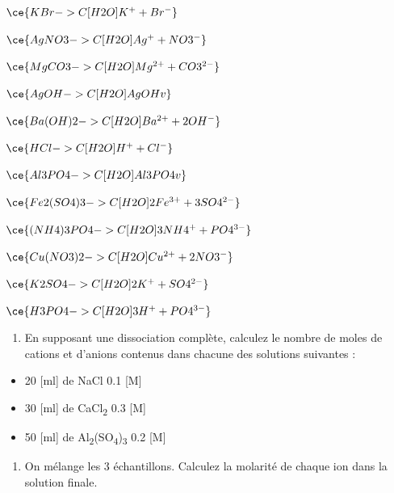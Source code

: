 \documentclass[
  11pt,
  french,
  a4paper,
  openany]{book}
\providecommand{\tightlist}{%
  \setlength{\itemsep}{0pt}\setlength{\parskip}{0pt}}
\begin{document}
\begin{Answer}

\begin{multicols}{2}
\(\ce{KBr ->C[H2O] K^{+} + Br^{-} }\)

\(\ce{AgNO3 ->C[H2O] Ag^{+} + NO3^{-} }\)

\(\ce{MgCO3 ->C[H2O] Mg^{2+} + CO3^{2-} }\)

\(\ce{AgOH ->C[H2O] AgOH v }\)

\(\ce{Ba(OH)2 ->C[H2O] Ba^{2+} + 2OH^{-} }\)

\(\ce{HCl ->C[H2O] H^{+} + Cl^{-}}\)

\(\ce{Al3PO4 ->C[H2O] Al3PO4 v }\)

\(\ce{Fe2(SO4)3 ->C[H2O] 2Fe^{3+} + 3SO4^{2-} }\)

\(\ce{(NH4)3PO4 ->C[H2O] 3NH4^{+} + PO4^{3-} }\)

\(\ce{Cu(NO3)2 ->C[H2O] Cu^{2+} + 2NO3^{-} }\)

\(\ce{K2SO4 ->C[H2O] 2K^{+} + SO4^{2-} }\)

\(\ce{H3PO4 ->C[H2O] 3H^{+} + PO4^{3-} }\)

\end{multicols}


\end{Answer}

\begin{Exercise}

\begin{enumerate}
\def\labelenumi{\arabic{enumi}.}
\tightlist
\item
  En supposant une dissociation complète, calculez le nombre de moles de cations et d'anions contenus dans chacune des solutions suivantes :
\end{enumerate}

\begin{itemize}
\tightlist
\item
  20 {[}ml{]} de NaCl 0.1 {[}M{]}\\
\item
  30 {[}ml{]} de CaCl\textsubscript{2} 0.3 {[}M{]}\\
\item
  50 {[}ml{]} de Al\textsubscript{2}(SO\textsubscript{4})\textsubscript{3} 0.2 {[}M{]}\\
\end{itemize}

\begin{enumerate}
\def\labelenumi{\arabic{enumi}.}
\setcounter{enumi}{1}
\tightlist
\item
  On mélange les 3 échantillons. Calculez la molarité de chaque ion dans la solution finale.\\
\end{enumerate}


\end{Exercise}
\end{document}
